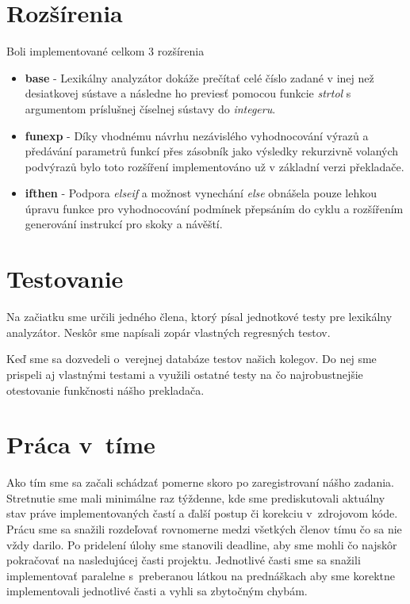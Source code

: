\documentclass{article}
\begin{document}
    \section{Rozšírenia}
    Boli implementované celkom 3 rozšírenia
        \begin{itemize}
            \item \textbf{base}   - Lexikálny analyzátor dokáže prečítať celé číslo zadané v inej než
                                    desiatkovej sústave a následne ho previesť pomocou funkcie 
                                    \emph{strtol} s argumentom príslušnej číselnej sústavy do \emph{integeru}.
            \item \textbf{funexp} - Díky vhodnému návrhu nezávislého vyhodnocování výrazů a předávání parametrů funkcí
                                    přes zásobník jako výsledky rekurzivně volaných podvýrazů bylo toto rozšíření implementováno
                                    už v základní verzi překladače.
            \item \textbf{ifthen} - Podpora \emph{elseif} a možnost vynechání \emph{else} obnášela pouze lehkou úpravu funkce
                                    pro vyhodnocování podmínek přepsáním do cyklu a rozšířením generování instrukcí
                                    pro skoky a návěští.
        \end{itemize}
    
    \section{Testovanie}
    Na začiatku sme určili jedného člena, ktorý písal jednotkové testy pre lexikálny analyzátor. 
    Neskôr sme napísali zopár vlastných regresných testov.
    
    Keď sme sa dozvedeli o~verejnej databáze testov našich kolegov. Do nej sme prispeli aj vlastnými testami a využili ostatné testy na čo najrobustnejšie otestovanie funkčnosti nášho prekladača.
    
    \section{Práca v~tíme}
    Ako tím sme sa začali schádzať pomerne skoro po zaregistrovaní nášho zadania. Stretnutie sme mali 
    minimálne raz týždenne, kde sme prediskutovali aktuálny stav práve implementovaných častí 
    a ďalší postup či korekciu v~zdrojovom kóde. Prácu sme sa snažili rozdeľovať rovnomerne medzi 
    všetkých členov tímu čo sa nie vždy darilo. Po pridelení úlohy sme stanovili deadline, aby sme 
    mohli čo najskôr pokračovať na nasledujúcej časti projektu. Jednotlivé časti sme sa snažili 
    implementovať paralelne s~preberanou látkou na prednáškach aby sme korektne implementovali
    jednotlivé časti a vyhli sa zbytočným chybám.
\end{document}
